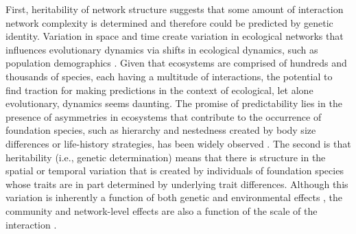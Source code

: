 \documentclass[fleqn,12pt]{olplainarticle}
\begin{document}
First, heritability of network structure suggests that some amount of
interaction network complexity is determined and therefore could be
predicted by genetic identity. Variation in space and time create variation in
ecological networks that influences evolutionary dynamics via shifts
in ecological dynamics, such as population demographics
\citep{Guimaraes2020TheOrganization}. Given that ecosystems are
comprised of hundreds and thousands of species, each having a
multitude of interactions, the potential to find traction for making
predictions in the context of ecological, let alone evolutionary,
dynamics seems daunting. The promise of predictability lies in the
presence of asymmetries in ecosystems that contribute to the
occurrence of foundation species, such as hierarchy and nestedness
created by body size differences or life-history strategies, has been
widely observed \citep{Ellison2005}. The second is that heritability
(i.e., genetic determination) means that there is structure in the
spatial or temporal variation that is created by individuals of
foundation species whose traits are in part determined by underlying
trait differences. Although this variation is inherently a function of
both genetic and environmental effects \citep{Conner2004ATextbook},
the community and network-level effects are also a function of the
scale of the interaction \citep{Shuster2006COMMUNITYSTRUCTURE}.
\end{document}
